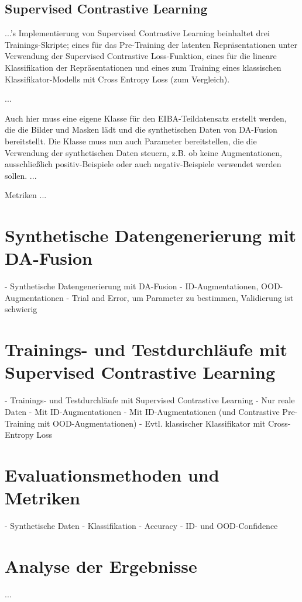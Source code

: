 \subsection{Supervised Contrastive Learning}

...'s Implementierung von Supervised Contrastive Learning beinhaltet drei Trainings-Skripte; eines für das Pre-Training der latenten Repräsentationen unter Verwendung der Supervised Contrastive Loss-Funktion, eines für die lineare Klassifikation der Repräsentationen und eines zum Training eines klassischen Klassifikator-Modells mit Cross Entropy Loss (zum Vergleich).

...

Auch hier muss eine eigene Klasse für den EIBA-Teildatensatz erstellt werden, die die Bilder und Masken lädt und die synthetischen Daten von DA-Fusion bereitstellt. Die Klasse muss nun auch Parameter bereitstellen, die die Verwendung der synthetischen Daten steuern, z.B. ob keine Augmentationen, ausschließlich positiv-Beispiele oder auch negativ-Beispiele verwendet werden sollen. ...

Metriken ...

\section{Synthetische Datengenerierung mit DA-Fusion}

- Synthetische Datengenerierung mit DA-Fusion
	- ID-Augmentationen, OOD-Augmentationen
	- Trial and Error, um Parameter zu bestimmen, Validierung ist schwierig

\section{Trainings- und Testdurchläufe mit Supervised Contrastive Learning}

- Trainings- und Testdurchläufe mit Supervised Contrastive Learning
	- Nur reale Daten
	- Mit ID-Augmentationen
	- Mit ID-Augmentationen (und Contrastive Pre-Training mit OOD-Augmentationen)
- Evtl. klassischer Klassifikator mit Cross-Entropy Loss

\section{Evaluationsmethoden und Metriken}

- Synthetische Daten
- Klassifikation
	- Accuracy
	- ID- und OOD-Confidence

\section{Analyse der Ergebnisse}

...
